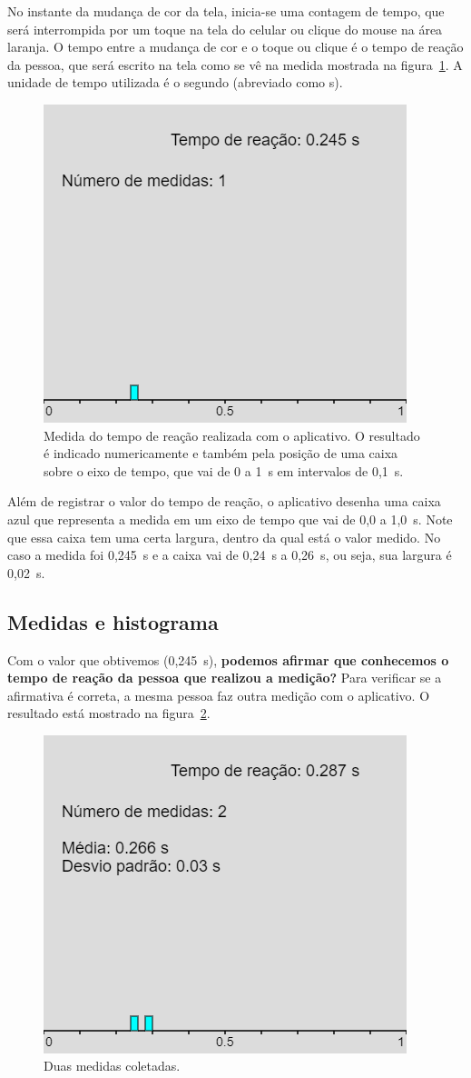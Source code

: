 \documentclass[12pt, a4paper]{article}
\begin{document}
No instante da mudança de cor da tela, inicia-se uma contagem de tempo, que será interrompida por um toque na tela do celular ou clique do mouse na área laranja. O tempo entre a mudança de cor e o toque ou clique é o tempo de reação da pessoa, que será escrito na tela como se vê na medida mostrada na figura~\ref{uma_medida}. A unidade de tempo utilizada é o segundo (abreviado como s).

\begin{figure}[H]
\centering
\includegraphics[width=0.52\linewidth]{new app4.png}
\caption{Medida do tempo de reação realizada com o aplicativo. O resultado é indicado numericamente e também pela posição de uma caixa sobre o eixo de tempo, que vai de 0 a 1~s em intervalos de 0,1~s.}
\label{uma_medida}
\end{figure}

Além de registrar o valor do tempo de reação, o aplicativo desenha uma caixa azul que representa a medida em um eixo de tempo que vai de 0,0 a 1,0~s. Note que essa caixa tem uma certa largura, dentro da qual está o valor medido. No caso a medida foi 0,245~s e a caixa vai de 0,24~s a 0,26~s, ou seja, sua largura é 0,02~s. 


\subsection{Medidas e histograma}

Com o valor que obtivemos (0,245~s), \textbf{podemos afirmar que conhecemos o tempo de reação da pessoa que realizou a medição?}
Para verificar se a afirmativa é correta, a mesma pessoa faz outra medição com o aplicativo. O resultado está mostrado na figura~\ref{duas_medidas}.

\begin{figure}[H]
\centering
\includegraphics[width=0.52\linewidth]{new app5.png}
\caption{ Duas medidas coletadas.}
\label{duas_medidas}
\end{figure}
\end{document}
